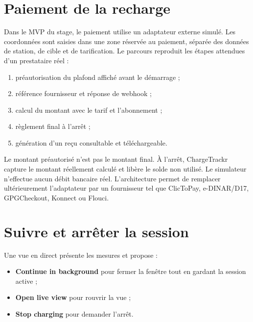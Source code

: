 
\section{Paiement de la recharge}

Dans le MVP du stage, le paiement utilise un adaptateur externe simulé. Les
coordonnées sont saisies dans une zone réservée au paiement, séparée des données
de station, de cible et de tarification. Le parcours reproduit les étapes
attendues d'un prestataire réel :

\begin{enumerate}[leftmargin=1.6em]
  \item préautorisation du plafond affiché avant le démarrage ;
  \item référence fournisseur et réponse de webhook ;
  \item calcul du montant avec le tarif et l'abonnement ;
  \item règlement final à l'arrêt ;
  \item génération d'un reçu consultable et téléchargeable.
\end{enumerate}

Le montant préautorisé n'est pas le montant final. À l'arrêt, ChargeTrackr
capture le montant réellement calculé et libère le solde non utilisé. Le
simulateur n'effectue aucun débit bancaire réel. L'architecture permet de
remplacer ultérieurement l'adaptateur par un fournisseur tel que ClicToPay,
e-DINAR/D17, GPGCheckout, Konnect ou Flouci.

\section{Suivre et arrêter la session}

Une vue en direct présente les mesures et propose :

\begin{itemize}[leftmargin=1.6em]
  \item \textbf{Continue in background} pour fermer la fenêtre tout en gardant la
  session active ;
  \item \textbf{Open live view} pour rouvrir la vue ;
  \item \textbf{Stop charging} pour demander l'arrêt.
\end{itemize}

